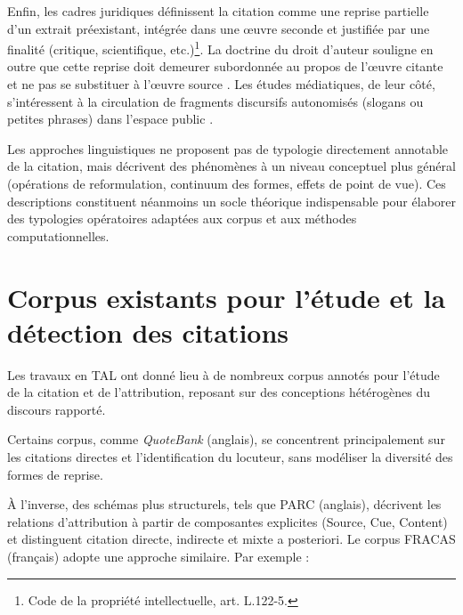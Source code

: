 \documentclass[final,fra]{anthology-ch}         %
\begin{document}
Enfin, les cadres juridiques définissent la citation comme une reprise partielle d’un extrait préexistant, intégrée dans une œuvre seconde et justifiée par une finalité (critique, scientifique, etc.)\footnote{Code de la propriété intellectuelle, art. L.122-5.}. La doctrine du droit d’auteur souligne en outre que cette reprise doit demeurer subordonnée au propos de l'œuvre citante et ne pas se substituer à l’œuvre source \cite{vivant_droit_2009,chambathouillon2016droit}. Les études médiatiques, de leur côté, s'intéressent à la circulation de fragments discursifs autonomisés (slogans ou petites phrases) dans l’espace public \cite{kriegplanque2010formule,boyer2018petites}.


Les approches linguistiques ne proposent pas de typologie directement
annotable de la citation, mais décrivent des phénomènes à un niveau
conceptuel plus général (opérations de reformulation, continuum des
formes, effets de point de vue). Ces descriptions constituent néanmoins
un socle théorique indispensable pour élaborer des typologies
opératoires adaptées aux corpus et aux méthodes computationnelles.

\section{Corpus existants pour l'étude et la détection des citations}

Les travaux en TAL ont donné lieu à de nombreux corpus annotés pour
l'étude de la citation et de l'attribution, reposant sur des conceptions
hétérogènes du discours rapporté.

Certains corpus, comme \textit{QuoteBank} (anglais), se concentrent
principalement sur les citations directes et l'identification du
locuteur, sans modéliser la diversité des formes de reprise.

À l'inverse, des schémas plus structurels, tels que PARC (anglais),
décrivent les relations d'attribution à partir de composantes explicites
(Source, Cue, Content) et distinguent citation directe, indirecte et
mixte a posteriori. Le corpus FRACAS (français) adopte une approche
similaire. Par exemple :
\end{document}
